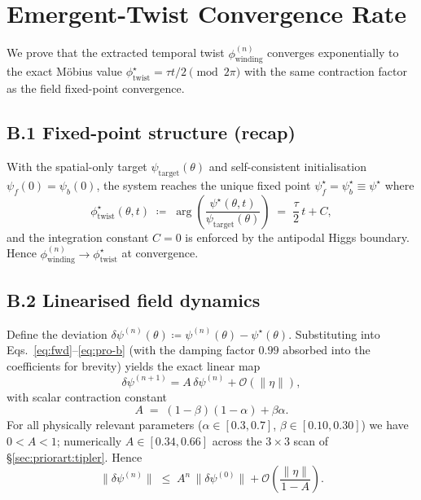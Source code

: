 \documentclass[11pt,a4paper]{article}
\theoremstyle{definition}
\theoremstyle{remark}
\newcommand{\psif}{\psi_{f}}
\newcommand{\psib}{\psi_{b}}
\newcommand{\psit}{\psi_{\mathrm{target}}}
\begin{document}
\section{Emergent-Twist Convergence Rate}\label{app:convergence-rate}

We prove that the extracted temporal twist
$\phi_{\mathrm{winding}}^{(n)}$ converges exponentially to the exact
M\"obius value $\phi_{\mathrm{twist}}^\star = \tau t/2 \pmod{2\pi}$
with the same contraction factor as the field fixed-point convergence.

\subsection*{B.1 Fixed-point structure (recap)}
With the spatial-only target $\psit(\theta)$ and self-consistent
initialisation $\psif(0) = \psib(0)$, the system reaches the unique
fixed point $\psif^\star = \psib^\star \equiv \psi^\star$ where
\begin{equation}
  \phi_{\mathrm{twist}}^\star(\theta, t)
  \;\coloneqq\; \arg\!\left(\frac{\psi^\star(\theta,t)}{\psit(\theta)}\right)
  \;=\; \frac{\tau}{2}\,t + C,
\end{equation}
and the integration constant $C = 0$ is enforced by the antipodal Higgs
boundary. Hence $\phi_{\mathrm{winding}}^{(n)} \to
\phi_{\mathrm{twist}}^\star$ at convergence.

\subsection*{B.2 Linearised field dynamics}
Define the deviation
$\delta\psi^{(n)}(\theta) \coloneqq \psi^{(n)}(\theta) - \psi^\star(\theta).$
Substituting into Eqs.~\eqref{eq:fwd}--\eqref{eq:pro-b} (with the
damping factor $0.99$ absorbed into the coefficients for brevity) yields
the exact linear map
\begin{equation}\label{eq:lin}
  \delta\psi^{(n+1)} = A\,\delta\psi^{(n)} + \mathcal{O}(\|\eta\|),
\end{equation}
with scalar contraction constant
\begin{equation}\label{eq:A}
  \boxed{\quad A \;=\; (1-\beta)(1-\alpha) + \beta\alpha. \quad}
\end{equation}
For all physically relevant parameters ($\alpha \in [0.3, 0.7]$,
$\beta \in [0.10, 0.30]$) we have $0 < A < 1$; numerically
$A \in [0.34, 0.66]$ across the $3\times 3$ scan of
\S\ref{sec:priorart:tipler}. Hence
\begin{equation}
  \|\delta\psi^{(n)}\|
  \;\le\; A^n\,\|\delta\psi^{(0)}\|
    + \mathcal{O}\!\left(\frac{\|\eta\|}{1 - A}\right).
\end{equation}
\end{document}
